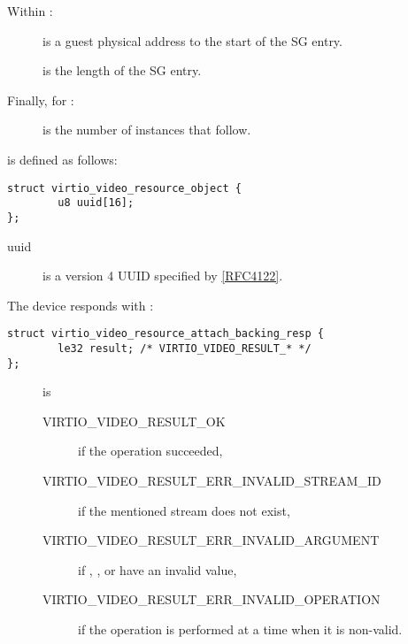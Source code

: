 Within :

\begin{description}
\item[]
is a guest physical address to the start of the SG entry.
\item[]
is the length of the SG entry.
\end{description}

Finally, for :

\begin{description}
\item[]
is the number of  instances
that follow.
\end{description}

 is defined as follows:

\begin{lstlisting}
struct virtio_video_resource_object {
        u8 uuid[16];
};
\end{lstlisting}

\begin{description}
\item[uuid]
is a version 4 UUID specified by \hyperref[intro:rfc4122]{[RFC4122]}.
\end{description}

The device responds with
:

\begin{lstlisting}
struct virtio_video_resource_attach_backing_resp {
        le32 result; /* VIRTIO_VIDEO_RESULT_* */
};
\end{lstlisting}

\begin{description}
\item[]
is

\begin{description}
\item[VIRTIO\_VIDEO\_RESULT\_OK]
if the operation succeeded,
\item[VIRTIO\_VIDEO\_RESULT\_ERR\_INVALID\_STREAM\_ID]
if the mentioned stream does not exist,
\item[VIRTIO\_VIDEO\_RESULT\_ERR\_INVALID\_ARGUMENT]
if , , or  have an
invalid value,
\item[VIRTIO\_VIDEO\_RESULT\_ERR\_INVALID\_OPERATION]
if the operation is performed at a time when it is non-valid.
\end{description}
\end{description}

